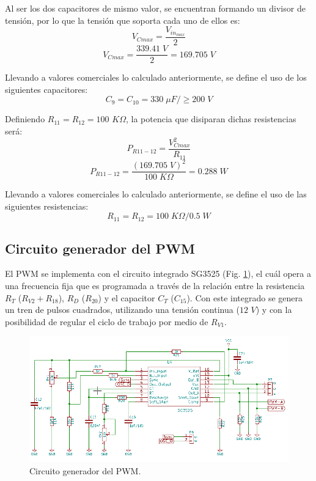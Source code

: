 \documentclass[11pt, a4paper]{article}
\begin{document}
Al ser los dos capacitores de mismo valor, se encuentran formando un divisor de tensión, por lo que la tensión que soporta cada uno de ellos es:
\begin{equation}
	V_{Cmax} = \frac{V_{in_{max}}}{2}
\label{VCMAX}
\end{equation}
\[ V_{Cmax} = \frac{339.41 \; V}{2} = 169.705 \; V \]

Llevando a valores comerciales lo calculado anteriormente, se define el uso de los siguientes capacitores:
\[ C_9 = C_{10} = 330 \; \mu F / \geq 200 \;V \]

Definiendo $R_{11} = R_{12} = 100$ $K\Omega$, la potencia que disiparan dichas resistencias será:
\begin{equation}
P_{R11-12} = \frac{V_{Cmax}^2}{R_{11}}
\label{PR1112}
\end{equation}
\[ P_{R11-12} = \frac{(169.705 \; V)^2}{100 \; K\Omega } = 0.288 \; W \]

Llevando a valores comerciales lo calculado anteriormente, se define el uso de las siguientes resistencias:
\[ R_{11} = R_{12} = 100 \; K\Omega / 0.5 \;W \]

\subsection{Circuito generador del PWM}
El PWM se implementa con el circuito integrado SG3525 (Fig. \ref{pwm}), el cuál opera a una frecuencia fija que es programada a través de la relación entre la resistencia $R_T$ ($R_{V2} + R_{18}$), $R_D$ ($R_{20}$) y el capacitor $C_T$ ($C_{15}$). Con este integrado se genera un tren de pulsos cuadrados, utilizando una tensión continua ($12$ $V$) y con la posibilidad de regular el ciclo de trabajo por medio de $R_{V1}$.

\begin{figure}[h]
	\centering
	\includegraphics[width = 12 cm]{Imagenes/PWM}
	\caption{Circuito generador del PWM.}
	\label{pwm}
\end{figure}
\end{document}
